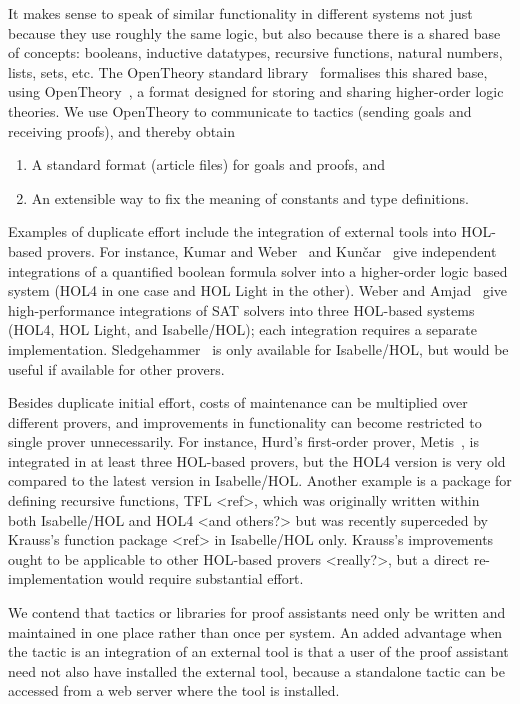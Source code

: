 \documentclass{llncs}
\newcommand{\OpenTheory}{OpenTheory\xspace}
\begin{document}
It makes sense to speak of similar functionality in different systems not just because they use roughly the same logic, but also because there is a shared base of concepts: booleans, inductive datatypes, recursive functions, natural numbers, lists, sets, etc.  
The \OpenTheory standard library~\cite{DBLP:conf/nfm/Hurd11} formalises this shared base, using \OpenTheory~\cite{hurd2009}, a format designed for storing and sharing higher-order logic theories.
We use \OpenTheory to communicate to tactics (sending goals and receiving proofs), and thereby obtain
\begin{enumerate}
\item
A standard format (article files) for goals and proofs, and
\item
An extensible way to fix the meaning of constants and type definitions.
\end{enumerate}

Examples of duplicate effort include the integration of external tools into HOL-based provers.
For instance, Kumar and Weber~\cite{DBLP:conf/itp/KumarW11} and Kun\v{c}ar~\cite{DBLP:conf/itp/Kuncar11} give independent integrations of a quantified boolean formula solver into a higher-order logic based system (HOL4 in one case and HOL Light in the other).
Weber and Amjad~\cite{weber09efficiently} give high-performance integrations of SAT solvers into three HOL-based systems (HOL4, HOL Light, and Isabelle/HOL); each integration requires a separate implementation.
Sledgehammer~\cite{DBLP:journals/japll/MengP09,Paulson_threeyears} is only available for Isabelle/HOL, but would be useful if available for other provers.

Besides duplicate initial effort, costs of maintenance can be multiplied over different provers, and improvements in functionality can become restricted to single prover unnecessarily.
For instance, Hurd's first-order prover, Metis~\cite{DBLP:conf/cade/Hurd02}, is integrated in at least three HOL-based provers, but the HOL4 version is very old compared to the latest version in Isabelle/HOL.
Another example is a package for defining recursive functions, TFL <ref>, which was originally written within both Isabelle/HOL and HOL4 <and others?> but was recently superceded by Krauss's function package <ref> in Isabelle/HOL only.
Krauss's improvements ought to be applicable to other HOL-based provers <really?>, but a direct re-implementation would require substantial effort.

We contend that tactics or libraries for proof assistants need only be written and maintained in one place rather than once per system. 
An added advantage when the tactic is an integration of an external tool is that a user of the proof assistant need not also have installed the external tool, because a standalone tactic can be accessed from a web server where the tool is installed.
\end{document}
